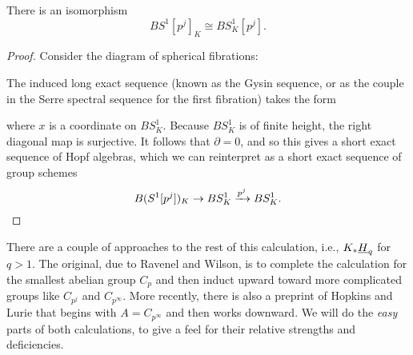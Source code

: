 \begin{theorem}
There is an isomorphism \[BS^1[p^j]_K \cong BS^1_K[p^j].\]
\end{theorem}
\begin{proof}
Consider the diagram of spherical fibrations:
\begin{center}
\end{center}
The induced long exact sequence (known as the Gysin sequence, or as the couple in the Serre spectral sequence for the first fibration) takes the form
\begin{center}
\end{center}
where $x$ is a coordinate on $BS^1_K$.  Because $BS^1_K$ is of finite height, the right diagonal map is surjective.  It follows that $\partial = 0$, and so this gives a short exact sequence of Hopf algebras, which we can reinterpret as a short exact sequence of group schemes \[B(S^1[p^j])_K \to BS^1_K \xrightarrow{p^j} BS^1_K. \qedhere\]
\end{proof}

There are a couple of approaches to the rest of this calculation, i.e., $K_* \underline{\smash{H}}_{q}$ for $q > 1$.  The original, due to Ravenel and Wilson, is to complete the calculation for the smallest abelian group $C_p$ and then induct upward toward more complicated groups like $C_{p^j}$ and $C_{p^\infty}$.  More recently, there is also a preprint of Hopkins and Lurie that begins with $A = C_{p^\infty}$ and then works downward.  We will do the \emph{easy} parts of both calculations, to give a feel for their relative strengths and deficiencies.

